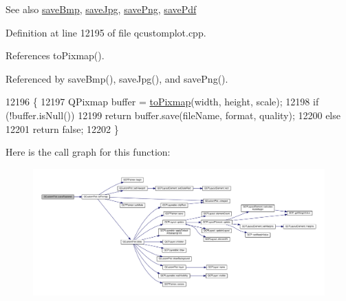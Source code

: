 \begin{DoxySeeAlso}{See also}
\hyperlink{class_q_custom_plot_a6629d9e8e6da4bf18055ee0257fdce9a}{save\+Bmp}, \hyperlink{class_q_custom_plot_a490c722092d1771e8ce4a7a73dfd84ab}{save\+Jpg}, \hyperlink{class_q_custom_plot_a7636261aff1f6d25c9da749ece3fc8b8}{save\+Png}, \hyperlink{class_q_custom_plot_a632da44c6d94ea8b271eb483b08b5114}{save\+Pdf} 
\end{DoxySeeAlso}


Definition at line 12195 of file qcustomplot.\+cpp.



References to\+Pixmap().



Referenced by save\+Bmp(), save\+Jpg(), and save\+Png().


\begin{DoxyCode}
12196                                                                               \{
12197   QPixmap buffer = \hyperlink{class_q_custom_plot_aabb974d71ce96c137dc04eb6eab844fe}{toPixmap}(width, height, scale);
12198   \textcolor{keywordflow}{if} (!buffer.isNull())
12199     \textcolor{keywordflow}{return} buffer.save(fileName, format, quality);
12200   \textcolor{keywordflow}{else}
12201     \textcolor{keywordflow}{return} \textcolor{keyword}{false};
12202 \}
\end{DoxyCode}


Here is the call graph for this function\+:\nopagebreak
\begin{figure}[H]
\begin{center}
\leavevmode
\includegraphics[width=350pt]{class_q_custom_plot_ab528b84cf92baabe29b1d0ef2f77c93e_cgraph}
\end{center}
\end{figure}




